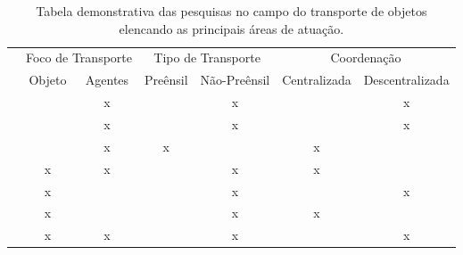 \begin{table}

\centering
\caption{Tabela demonstrativa das pesquisas no campo do transporte de objetos elencando as principais áreas de atuação.}
\label{table:related_works}
\begin{tabular}{l|c|c|l|c|c|c|}
\cline{2-7}
                                                & \multicolumn{2}{c|}{Foco de Transporte}       & \multicolumn{2}{c|}{Tipo de Transporte}                & \multicolumn{2}{c|}{Coordenação}              \\ \cline{2-7}
                                                & Objeto                & Agentes               & \multicolumn{1}{c|}{Preênsil} & Não-Preênsil           & Centralizada          & Descentralizada       \\ \hline
\multicolumn{1}{|l|}{\cite{Pereira2004}}        &                       & x                     & \multicolumn{1}{c|}{}         & x                      &                       & x                     \\ \hline
\multicolumn{1}{|l|}{\cite{Fink2008}}           &                       & x                     & \multicolumn{1}{c|}{}         & x                      &                       & x                     \\ \hline
\multicolumn{1}{|l|}{\cite{Behrens2010}}        & \multicolumn{1}{l|}{} & x                     & \multicolumn{1}{c|}{x}        & \multicolumn{1}{l|}{}  & x                     & \multicolumn{1}{l|}{} \\ \hline
\multicolumn{1}{|l|}{\cite{Eoh2011}}            & x                     & x                     &                               & x                      & x                     & \multicolumn{1}{l|}{} \\ \hline
\multicolumn{1}{|l|}{\cite{Inoue2011}}          & x                     & \multicolumn{1}{l|}{} &                               & x                      & \multicolumn{1}{l|}{} & x                     \\ \hline
\multicolumn{1}{|l|}{\cite{Nagai2011}}          & x                     & \multicolumn{1}{l|}{} &                               & x                      & x                     & \multicolumn{1}{l|}{} \\ \hline
\multicolumn{1}{|l|}{\cite{Costa2012}}          & x                     & x                     &                               & x                      & \multicolumn{1}{l|}{} & x                     \\ \hline

\end{tabular}
\end{table}
